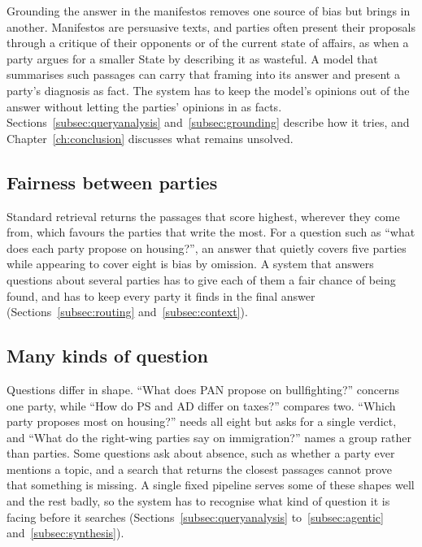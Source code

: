 Grounding the answer in the manifestos removes one source of bias but brings in another. Manifestos are persuasive texts, and parties often present their proposals through a critique of their opponents or of the current state of affairs, as when a party argues for a smaller State by describing it as wasteful. A model that summarises such passages can carry that framing into its answer and present a party's diagnosis as fact. The system has to keep the model's opinions out of the answer without letting the parties' opinions in as facts. Sections~\ref{subsec:queryanalysis} and~\ref{subsec:grounding} describe how it tries, and Chapter~\ref{ch:conclusion} discusses what remains unsolved.

\subsection{Fairness between parties} \label{subsec:challenge-fairness}

Standard retrieval returns the passages that score highest, wherever they come from, which favours the parties that write the most. For a question such as ``what does each party propose on housing?'', an answer that quietly covers five parties while appearing to cover eight is bias by omission. A system that answers questions about several parties has to give each of them a fair chance of being found, and has to keep every party it finds in the final answer (Sections~\ref{subsec:routing} and~\ref{subsec:context}).

\subsection{Many kinds of question} \label{subsec:challenge-questions}

Questions differ in shape. ``What does PAN propose on bullfighting?'' concerns one party, while ``How do PS and AD differ on taxes?'' compares two. ``Which party proposes most on housing?'' needs all eight but asks for a single verdict, and ``What do the right-wing parties say on immigration?'' names a group rather than parties. Some questions ask about absence, such as whether a party ever mentions a topic, and a search that returns the closest passages cannot prove that something is missing. A single fixed pipeline serves some of these shapes well and the rest badly, so the system has to recognise what kind of question it is facing before it searches (Sections~\ref{subsec:queryanalysis} to~\ref{subsec:agentic} and~\ref{subsec:synthesis}).

